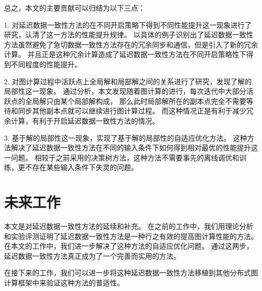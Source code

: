 总之，本文的主要贡献可以归结为以下三点：


1. 对延迟数据一致性方法的在不同开启策略下得到不同性能提升这一现象进行了研究，认清了这一方法的性能提升规律。
以具体的例子识别出了延迟数据一致性方法虽然避免了急切数据一致性方法存在的冗余同步和通信，但是引入了新的冗余计算。
并且正是这种冗余计算造成了延迟数据一致性方法在不同开启策略性下得到不同程度的性能提升。

2. 对图计算过程中活跃点上全局解和局部解之间的关系进行了研究，发现了解的局部性这一现象。
通过分析，本文发现随着图计算的进行，每次迭代中大部分活跃点的全局解只由某个局部解构成，
那么此时局部解所在的副本点完全不需要等待和同步其他副本点就可以继续进行图计算过程。
而这种情况正是有利于减少冗余计算，有利于开启延迟数据一致性方法的情况。

3. 基于解的局部性这一现象，实现了基于解的局部性的自适应优化方法。
这种方法解决了延迟数据一致性方法在不同的输入条件下如何得到相对最优的性能提升这一问题。
相较于之前采用的决策树方法，这种方法不需要事先的离线调优和训练，更不存在某些输入条件下失灵的问题。

\section{未来工作}

本文是对延迟数据一致性方法的延续和补充。
在之前的工作中，我们用理论分析和实验评测证明了延迟数据一致性方法是一种行之有效的提高图计算性能的方法。
在本文的工作中，我们进一步解决了这种方法的自适应优化问题。
通过这两步，延迟数据一致性方法真正成为了一个完善而实用的方法。

在接下来的工作，我们可以进一步将这种延迟数据一致性方法移植到其他分布式图计算框架中来验证这种方法的普适性。


